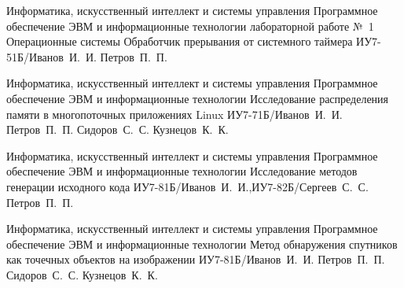 \documentclass{bmstu}
\begin{document}



\makereporttitle
    {Информатика, искусственный интеллект и системы управления} %
    {Программное обеспечение ЭВМ и информационные технологии} %
    {лабораторной работе №~1} %
    {Операционные системы} %
    {Обработчик прерывания от системного таймера} %
    {} %
    {ИУ7-51Б/Иванов~И.~И.} %
    {Петров~П.~П.} %


\makecourseworktitle
    {Информатика, искусственный интеллект и системы управления} %
    {Программное обеспечение ЭВМ и информационные технологии} %
    {Исследование распределения памяти в многопоточных приложениях Linux} %
    {ИУ7-71Б/Иванов~И.~И.} %
    {Петров~П.~П.} %
    {Сидоров~С.~С.} %
    {Кузнецов~К.~К.} %
    

\makeresearchtitle
    {Информатика, искусственный интеллект и системы управления} %
    {Программное обеспечение ЭВМ и информационные технологии} %
    {Исследование методов генерации исходного кода} %
    {ИУ7-81Б/Иванов~И.~И.,ИУ7-82Б/Сергеев~С.~С.} %
    {Петров~П.~П.} %
    {} %
    {} %


\makethesistitle
    {Информатика, искусственный интеллект и системы управления} %
    {Программное обеспечение ЭВМ и информационные технологии} %
    {Метод обнаружения спутников как точечных объектов на изображении} %
    {ИУ7-81Б/Иванов~И.~И.} %
    {Петров~П.~П.} %
    {Сидоров~С.~С.} %
    {} %
    {Кузнецов~К.~К.} %
\end{document}
